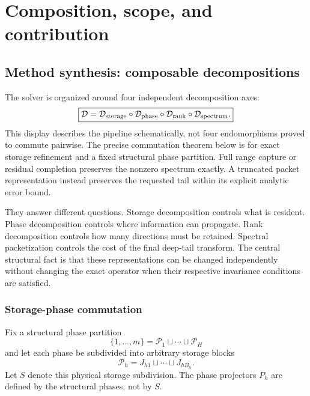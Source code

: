 \chapter{Composition, scope, and contribution}\label{ch:synthesis}
\section{Method synthesis: composable decompositions}\label{sec:final-29}

The solver is organized around four independent decomposition axes:
\[
\boxed{
\mathcal D
=
\mathcal D_{\rm storage}
\circ
\mathcal D_{\rm phase}
\circ
\mathcal D_{\rm rank}
\circ
\mathcal D_{\rm spectrum}.
}
\]
This display describes the pipeline schematically, not four endomorphisms
proved to commute pairwise.  The precise commutation theorem below is for
exact storage refinement and a fixed structural phase partition.  Full range
capture or residual completion preserves the nonzero spectrum exactly. A
truncated packet representation instead preserves the requested tail within
its explicit analytic error bound.

They answer different questions.  Storage decomposition controls what is
resident.  Phase decomposition controls where information can propagate.
Rank decomposition controls how many directions must be retained.  Spectral
packetization controls the cost of the final deep-tail transform.  The central
structural fact is that these representations can be changed independently
without changing the exact operator when their respective invariance
conditions are satisfied.

\subsection{Storage-phase commutation}

Fix a structural phase partition
\[
\{1,\ldots,m\}=\mathcal P_1\sqcup\cdots\sqcup\mathcal P_H
\]
and let each phase be subdivided into arbitrary storage blocks
\[
\mathcal P_h
=
J_{h1}\sqcup\cdots\sqcup J_{hB_h}.
\]
Let $S$ denote this physical storage subdivision.  The phase projectors
$P_h$ are defined by the structural phases, not by $S$.

